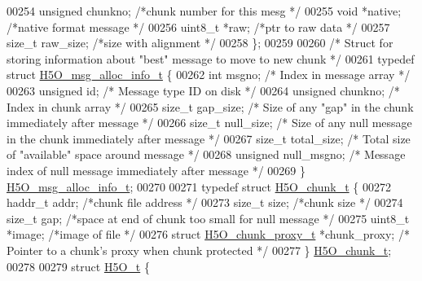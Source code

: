 \begin{DoxyCode}
00254     \textcolor{keywordtype}{unsigned}        chunkno;    \textcolor{comment}{/*chunk number for this mesg         */}
00255     \textcolor{keywordtype}{void}        *native;    \textcolor{comment}{/*native format message          */}
00256     uint8\_t     *raw;       \textcolor{comment}{/*ptr to raw data            */}
00257     \textcolor{keywordtype}{size\_t}      raw\_size;   \textcolor{comment}{/*size with alignment            */}
00258 \};
00259 
00260 \textcolor{comment}{/* Struct for storing information about "best" message to move to new chunk */}
00261 \textcolor{keyword}{typedef} \textcolor{keyword}{struct }\hyperlink{struct_h5_o__msg__alloc__info__t}{H5O\_msg\_alloc\_info\_t} \{
00262     \textcolor{keywordtype}{int} msgno;                      \textcolor{comment}{/* Index in message array */}
00263     \textcolor{keywordtype}{unsigned} id;            \textcolor{comment}{/* Message type ID on disk */}
00264     \textcolor{keywordtype}{unsigned} chunkno;               \textcolor{comment}{/* Index in chunk array */}
00265     \textcolor{keywordtype}{size\_t} gap\_size;                \textcolor{comment}{/* Size of any "gap" in the chunk immediately after message */}
00266     \textcolor{keywordtype}{size\_t} null\_size;               \textcolor{comment}{/* Size of any null message in the chunk immediately after message */}
00267     \textcolor{keywordtype}{size\_t} total\_size;              \textcolor{comment}{/* Total size of "available" space around message */}
00268     \textcolor{keywordtype}{unsigned} null\_msgno;            \textcolor{comment}{/* Message index of null message immediately after message */}
00269 \} \hyperlink{struct_h5_o__msg__alloc__info__t}{H5O\_msg\_alloc\_info\_t};
00270 
00271 \textcolor{keyword}{typedef} \textcolor{keyword}{struct }\hyperlink{struct_h5_o__chunk__t}{H5O\_chunk\_t} \{
00272     haddr\_t addr;           \textcolor{comment}{/*chunk file address             */}
00273     \textcolor{keywordtype}{size\_t}  size;           \textcolor{comment}{/*chunk size                 */}
00274     \textcolor{keywordtype}{size\_t}  gap;            \textcolor{comment}{/*space at end of chunk too small for null message */}
00275     uint8\_t *image;         \textcolor{comment}{/*image of file              */}
00276     \textcolor{keyword}{struct }\hyperlink{struct_h5_o__chunk__proxy__t}{H5O\_chunk\_proxy\_t} *chunk\_proxy;    \textcolor{comment}{/* Pointer to a chunk's proxy when chunk
       protected */}
00277 \} \hyperlink{struct_h5_o__chunk__t}{H5O\_chunk\_t};
00278 
00279 \textcolor{keyword}{struct }\hyperlink{struct_h5_o__t}{H5O\_t} \{

\end{DoxyCode}
